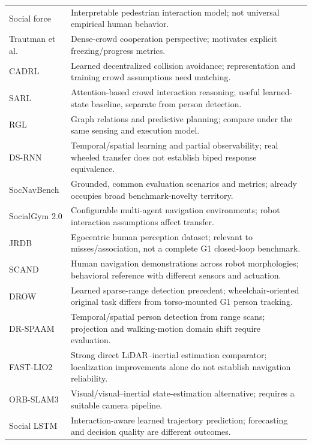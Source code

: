 \documentclass[11pt,a4paper]{article}
\begin{document}
\begin{longtable}{P{0.28\textwidth}P{0.65\textwidth}}
Social force \citep{socialforce} & Interpretable pedestrian interaction model; not universal empirical human behavior. \\
Trautman et al. \citep{freezing} & Dense-crowd cooperation perspective; motivates explicit freezing/progress metrics. \\
CADRL \citep{cadrl} & Learned decentralized collision avoidance; representation and training crowd assumptions need matching. \\
SARL \citep{sarl} & Attention-based crowd interaction reasoning; useful learned-state baseline, separate from person detection. \\
RGL \citep{rgl} & Graph relations and predictive planning; compare under the same sensing and execution model. \\
DS-RNN \citep{dsrnn} & Temporal/spatial learning and partial observability; real wheeled transfer does not establish biped response equivalence. \\
SocNavBench \citep{socnavbench} & Grounded, common evaluation scenarios and metrics; already occupies broad benchmark-novelty territory. \\
SocialGym 2.0 \citep{socialgym} & Configurable multi-agent navigation environments; robot interaction assumptions affect transfer. \\
JRDB \citep{jrdb} & Egocentric human perception dataset; relevant to misses/association, not a complete G1 closed-loop benchmark. \\
SCAND \citep{scand} & Human navigation demonstrations across robot morphologies; behavioral reference with different sensors and actuation. \\
DROW \citep{drow} & Learned sparse-range detection precedent; wheelchair-oriented original task differs from torso-mounted G1 person tracking. \\
DR-SPAAM \citep{drspaam} & Temporal/spatial person detection from range scans; projection and walking-motion domain shift require evaluation. \\
FAST-LIO2 \citep{fastlio} & Strong direct LiDAR--inertial estimation comparator; localization improvements alone do not establish navigation reliability. \\
ORB-SLAM3 \citep{orbslam} & Visual/visual--inertial state-estimation alternative; requires a suitable camera pipeline. \\
Social LSTM \citep{sociallstm} & Interaction-aware learned trajectory prediction; forecasting and decision quality are different outcomes. \\

\end{longtable}
\end{document}
